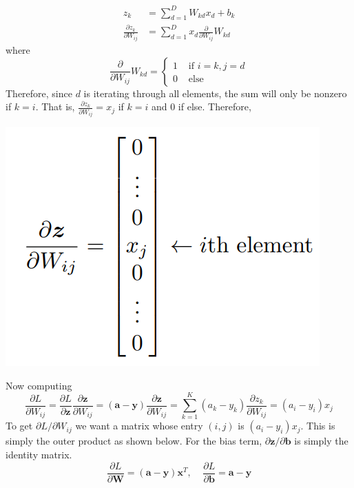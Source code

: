 \documentclass{article}
\theoremstyle{definition}
\theoremstyle{remark}
\theoremstyle{definition}
\begin{document}
\begin{align*}
    z_k & = \sum_{d=1}^D W_{kd} x_d + b_k \\ 
    \frac{\partial z_k}{\partial W_{ij}} & = \sum_{d=1}^D x_d \frac{\partial}{\partial W_{ij}} W_{kd}
\end{align*}
where 
\[\frac{\partial}{\partial W_{ij}} W_{kd} = \begin{cases} 1 & \text{ if } i = k, j = d \\ 0 & \text{ else} \end{cases}\]
Therefore, since $d$ is iterating through all elements, the sum will only be nonzero if $k = i$. That is, $\frac{\partial z_k}{\partial W_{ij}} = x_j$ if $k = i$ and $0$ if else. Therefore, 
\begin{center}
    \includegraphics[scale=0.3]{softmax_deriv.png}
\end{center}
Now computing 
\[\frac{\partial L}{\partial W_{ij}} = \frac{\partial L}{\partial \mathbf{z}} \frac{\partial \mathbf{z}}{\partial W_{ij}} = (\mathbf{a} - \mathbf{y}) \frac{\partial \mathbf{z}}{\partial W_{ij}} = \sum_{k=1}^K (a_k - y_k) \frac{\partial z_k}{\partial W_{ij}} = (a_i - y_i) x_j\]
To get $\partial L / \partial W_{ij}$ we want a matrix whose entry $(i, j)$ is $(a_i - y_i) x_j$. This is simply the outer product as shown below. For the bias term, $\partial \mathbf{z} / \partial \mathbf{b}$ is simply the identity matrix. 
\[\frac{\partial L}{\partial \mathbf{W}} = (\mathbf{a} - \mathbf{y}) \mathbf{x}^T, \;\;\;\; \frac{\partial L}{\partial \mathbf{b}} = \mathbf{a} - \mathbf{y}\]
\end{document}
